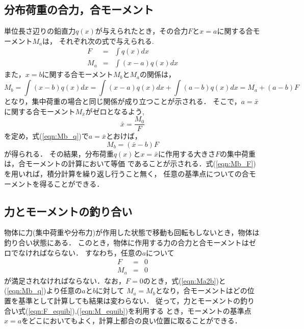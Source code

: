 \documentclass[10pt,a4j]{jarticle}
\begin{document}
\subsection{分布荷重の合力，合モーメント}
単位長さ辺りの鉛直力$q(x)$が与えられたとき，その合力$F$と$x=a$に関する合モーメント$M_a$は，
それぞれ次の式で与えられる.
\begin{eqnarray}
	F &= & \int q(x) dx 
	\label{eqn:Ftot_q}
	\\
	M_a &= & \int (x-a)q(x) dx 
	\label{eqn:Mtot_q}
\end{eqnarray}
また，$x=b$に関する合モーメント$M_b$と$M_a$の関係は，
\begin{equation}
	M_b = \int (x-b)q(x)dx = \int (x-a)q(x) dx + \int (a-b)q(x)dx = M_a+(a-b) F
	\label{eqn:Mb_q}
\end{equation}
となり，集中荷重の場合と同じ関係が成り立つことが示される．
そこで，$a=\bar x$に関する合モーメント$M_{\bar x}$がゼロとなるよう,
\begin{equation}
	\bar x = \frac{M_0}{F}
\end{equation}
を定め，式(\ref{eqn:Mb_q})で$a=\bar x$とおけば，
\begin{equation}
	M_b=\left(\bar x - b\right)F
	\label{eqn:Mb_F}
\end{equation}
が得られる．
その結果，分布荷重$q(x)$と$x=\bar x$に作用する大きさ$F$の集中荷重は，合モーメントの計算において等価
であることが示される．式(\ref{eqn:Mb_F})を用いれば，積分計算を繰り返し行うこと無く，
任意の基準点についての合モーメントを得ることができる．
\subsection{力とモーメントの釣り合い}
物体に力(集中荷重や分布力)が作用した状態で移動も回転もしないとき，物体は釣り合い状態にある．
このとき，物体に作用する力の合力と合モーメントはゼロでなければならない．
すなわち，任意の$a$について
\begin{eqnarray}
	F &= &  0 
	\label{eqn:F_equib}
	\\
	M_a &= &  
	0 
	\label{eqn:M_equib}
\end{eqnarray}
が満足されなければならない．なお，$F=0$のとき，式(\ref{eqn:Ma2b})と(\ref{eqn:Mb_q})より任意の$a$と$b$に対して
$M_a=M_b$となり，合モーメントはどの位置を基準として計算しても結果は変わらない．
従って，力とモーメントの釣り合い式(\ref{eqn:F_equib}),(\ref{eqn:M_equib})を利用する
とき，モーメントの基準点$x=a$をどこにおいてもよく，計算上都合の良い位置に取ることができる．
\end{document}
